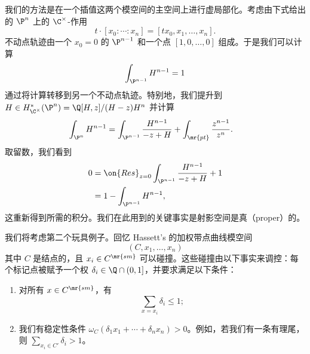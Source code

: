 我们的方法是在一个插值这两个模空间的主空间上进行虚局部化。考虑由下式给出的 \(\P^n\) 上的 \(\C^{\times}\)-作用
\[ t \cdot [x_0 : \cdots : x_n] = [t x_0, x_1, \ldots, x_n]. \]
不动点轨迹由一个 \(x_0 = 0\) 的 \(\P^{n-1}\) 和一个点 \([1, 0, \ldots, 0]\) 组成。于是我们可以计算
\[ \int_{\P^{n-1}} H^{n-1} = 1 \]
通过将计算转移到另一个不动点轨迹。特别地，我们提升到 \(H \in H_{\C^{\times}}^* (\P^n) = \Q[H,z] / (H-z)H^n\) 并计算
\begin{align*}
    \int_{\P^n} H^{n-1} &= \int_{\P^{n-1}} \frac{H^{n-1}}{-z+H} + \int_{\mr{pt}} \frac{z^{n-1}}{z^n}.
\end{align*}
取留数，我们看到
\begin{align*}
    0 &= \on{Res}_{z = 0}\int_{\P^{n-1}} \frac{H^{n-1}}{-z+H} + 1 \\
    &= 1 - \int_{\P^{n-1}}H^{n-1},
\end{align*}
这重新得到所需的积分。我们在此用到的关键事实是射影空间是真（proper）的。

\begin{exm}
    我们将考虑第二个玩具例子。回忆 Hassett's 的加权带点曲线模空间
    \[ (C, x_1, \ldots, x_n) \]
    其中 \(C\) 是结点的，且 \(x_i \in C^{\mr{sm}}\) 可以碰撞。这些碰撞由以下事实来调控：每个标记点被赋予一个权 \(\delta_i \in \Q \cap (0,1]\)，并要求满足以下条件：
    \begin{enumerate}
        \item 对所有 \(x \in C^{\mr{sm}}\)，有
            \[ \sum_{x = x_i} \delta_i \leq 1; \]
        \item 我们有稳定性条件 \(\omega_C(\delta_1 x_1 + \cdots + \delta_n x_n) > 0\)。例如，若我们有一条有理尾，则 \(\sum_{x_i \in C'} \delta_i > 1\)。
    \end{enumerate}
\end{exm}

